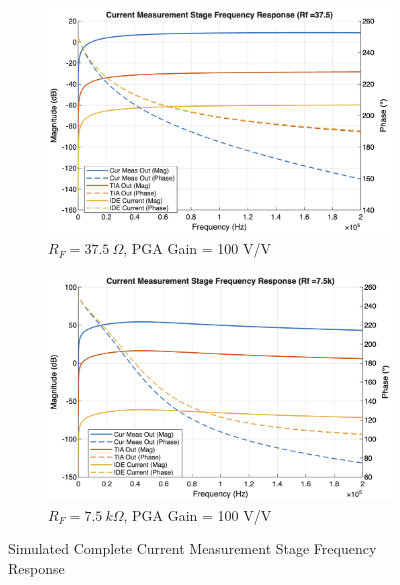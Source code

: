 \begin{figure}[H]
    \centering
    \begin{subfigure}[b]{0.48\textwidth}
        \centering
        \includegraphics[width=\textwidth]{FullCurrentMEasurementStageFreqResponse_37,5.png}
        \caption{$R_F = 37.5~\Omega$, PGA Gain = 100 V/V}
        \label{fig:i_meas_freq_37.5}
    \end{subfigure}\hfill
    \begin{subfigure}[b]{0.48\textwidth}
        \centering
        \includegraphics[width=\textwidth]{FullCurrentMEasurementStageFreqResponse_7500.png} 
        \caption{$R_F = 7.5~k\Omega$, PGA Gain = 100 V/V}
        \label{fig:i_meas_freq_7.5k}
    \end{subfigure}
    \caption{Simulated Complete Current Measurement Stage Frequency Response}
    \label{fig:i_meas_freq}
\end{figure}

